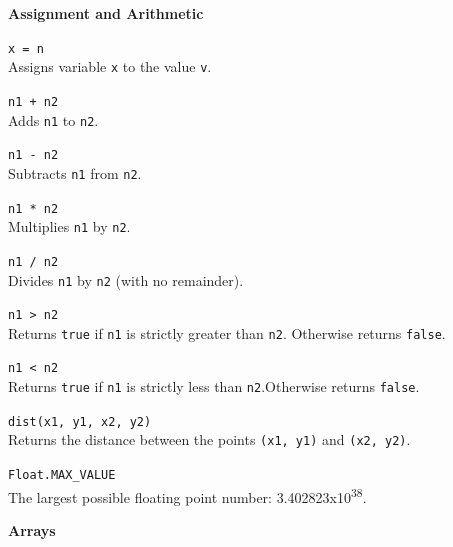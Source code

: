 \documentclass[10pt,twocolumn]{article}
\begin{document}
\noindent\textbf{\large Assignment and Arithmetic}
\begin{description}

\item{\texttt{x = n}} \ \\[.25em]
 Assigns variable \texttt{x} to the value \texttt{v}.

\item{\texttt{n1 + n2}} \ \\[.25em]
 Adds \texttt{n1} to \texttt{n2}. 

\item{\texttt{n1 - n2}} \ \\[.25em]
 Subtracts \texttt{n1} from \texttt{n2}. 

\item{\texttt{n1 * n2}} \ \\[.25em]
 Multiplies \texttt{n1} by \texttt{n2}. 

\item{\texttt{n1 / n2}} \ \\[.25em]
 Divides \texttt{n1} by \texttt{n2} (with no remainder).
  
 \item{\texttt{n1 > n2}} \ \\[.25em]
Returns \texttt{true} if \texttt{n1} is strictly greater than \texttt{n2}. Otherwise returns \texttt{false}.

 \item{\texttt{n1 < n2}} \ \\[.25em]
Returns \texttt{true} if \texttt{n1} is strictly less than \texttt{n2}.Otherwise returns \texttt{false}.

 \item{\texttt{dist(x1, y1, x2, y2)}} \ \\[.25em]
Returns the distance between the points \mbox{\texttt{(x1, y1)}} and \mbox{\texttt{(x2, y2)}}.

 \item{\texttt{Float.MAX\_VALUE}} \ \\[.25em]
The largest possible floating point number: 3.402823x10\textsuperscript{38}.

\end{description}

\medskip

\noindent\textbf{\large Arrays}
\end{document}
